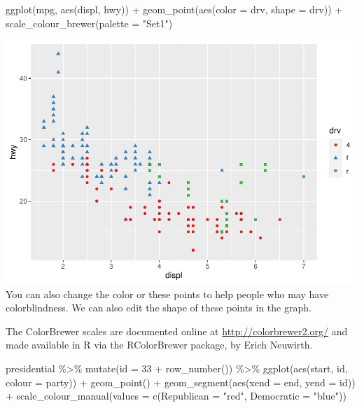 \documentclass[
]{article}
\newenvironment{Shaded}{\begin{snugshade}}{\end{snugshade}}
\newcommand{\AttributeTok}[1]{\textcolor[rgb]{0.77,0.63,0.00}{#1}}
\newcommand{\DecValTok}[1]{\textcolor[rgb]{0.00,0.00,0.81}{#1}}
\newcommand{\FunctionTok}[1]{\textcolor[rgb]{0.00,0.00,0.00}{#1}}
\newcommand{\NormalTok}[1]{#1}
\newcommand{\SpecialCharTok}[1]{\textcolor[rgb]{0.00,0.00,0.00}{#1}}
\newcommand{\StringTok}[1]{\textcolor[rgb]{0.31,0.60,0.02}{#1}}
\begin{document}
\begin{Shaded}
\begin{Highlighting}[]
\FunctionTok{ggplot}\NormalTok{(mpg, }\FunctionTok{aes}\NormalTok{(displ, hwy)) }\SpecialCharTok{+}
  \FunctionTok{geom\_point}\NormalTok{(}\FunctionTok{aes}\NormalTok{(}\AttributeTok{color =}\NormalTok{ drv, }\AttributeTok{shape =}\NormalTok{ drv)) }\SpecialCharTok{+}
  \FunctionTok{scale\_colour\_brewer}\NormalTok{(}\AttributeTok{palette =} \StringTok{"Set1"}\NormalTok{)}
\end{Highlighting}
\end{Shaded}

\includegraphics{Journal_files/figure-latex/unnamed-chunk-59-3.pdf} You
can also change the color or these points to help people who may have
colorblindness. We can also edit the shape of these points in the graph.

The ColorBrewer scales are documented online at
\url{http://colorbrewer2.org/} and made available in R via the
RColorBrewer package, by Erich Neuwirth.

\begin{Shaded}
\begin{Highlighting}[]
\NormalTok{presidential }\SpecialCharTok{\%\textgreater{}\%}
  \FunctionTok{mutate}\NormalTok{(}\AttributeTok{id =} \DecValTok{33} \SpecialCharTok{+} \FunctionTok{row\_number}\NormalTok{()) }\SpecialCharTok{\%\textgreater{}\%}
  \FunctionTok{ggplot}\NormalTok{(}\FunctionTok{aes}\NormalTok{(start, id, }\AttributeTok{colour =}\NormalTok{ party)) }\SpecialCharTok{+}
    \FunctionTok{geom\_point}\NormalTok{() }\SpecialCharTok{+}
    \FunctionTok{geom\_segment}\NormalTok{(}\FunctionTok{aes}\NormalTok{(}\AttributeTok{xend =}\NormalTok{ end, }\AttributeTok{yend =}\NormalTok{ id)) }\SpecialCharTok{+}
    \FunctionTok{scale\_colour\_manual}\NormalTok{(}\AttributeTok{values =} \FunctionTok{c}\NormalTok{(}\AttributeTok{Republican =} \StringTok{"red"}\NormalTok{, }\AttributeTok{Democratic =} \StringTok{"blue"}\NormalTok{))}
\end{Highlighting}
\end{Shaded}
\end{document}
